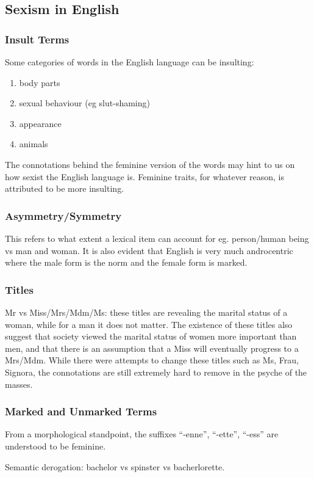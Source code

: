 \documentclass[../main.tex]{subfiles}
\begin{document}
        \subsection{Sexism in English}
            \subsubsection{Insult Terms}
            Some categories of words in the English language can be insulting: \begin{enumerate}
                \item body parts
                \item sexual behaviour (eg slut-shaming)
                \item appearance
                \item animals
            \end{enumerate}
            The connotations behind the feminine version of the words may hint to us on how sexist the English language is. Feminine traits, for whatever reason, is attributed to be more insulting.

            \subsubsection{Asymmetry/Symmetry}
            This refers to what extent a lexical item can account for eg. person/human being vs man and woman. It is also evident that English is very much androcentric where the male form is the norm and the female form is marked. 

            \subsubsection{Titles}
            Mr vs Miss/Mrs/Mdm/Ms: these titles are revealing the marital status of a woman, while for a man it does not matter. The existence of these titles also suggest that society viewed the marital status of women more important than men, and that there is an assumption that a Miss will eventually progress to a Mrs/Mdm. While there were attempts to change these titles such as Ms, Frau, Signora, the connotations are still extremely hard to remove in the psyche of the masses. 

            \subsubsection{Marked and Unmarked Terms}
            From a morphological standpoint, the suffixes ``-enne'', ``-ette'', ``-ess'' are understood to be feminine. \par
            Semantic derogation: bachelor vs spinster vs bacherlorette.
\end{document}
